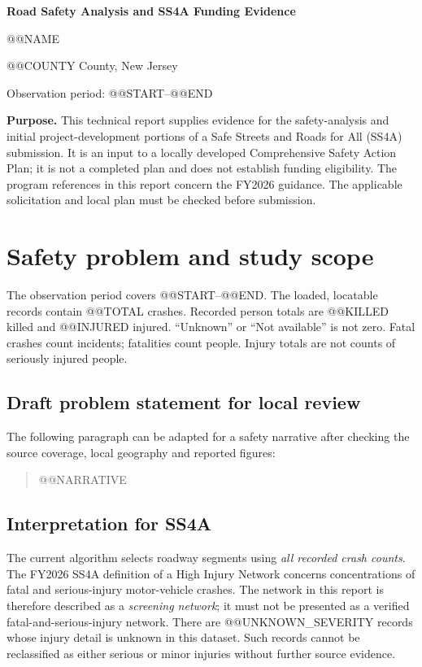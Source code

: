 \documentclass[10pt,letterpaper]{article}
\begin{document}
\begin{center}
{\Large\bfseries Road Safety Analysis and SS4A Funding Evidence}\par
\vspace{4pt}
{\large @@NAME}\par
@@COUNTY County, New Jersey\par
Observation period: @@START--@@END
\end{center}
\vspace{4pt}
\textbf{Purpose.} This technical report supplies evidence for the safety-analysis
and initial project-development portions of a Safe Streets and Roads for All
(SS4A) submission. It is an input to a locally developed Comprehensive Safety
Action Plan; it is not a completed plan and does not establish funding eligibility.
The program references in this report concern the FY2026 guidance. The applicable
solicitation and local plan must be checked before submission.\cite{nofo,actionplan}

\section{Safety problem and study scope}
The observation period covers @@START--@@END. The loaded, locatable records contain
@@TOTAL crashes. Recorded person totals are @@KILLED killed and @@INJURED injured.
``Unknown'' or ``Not available'' is not zero. Fatal crashes count incidents;
fatalities count people. Injury totals are not counts of seriously injured people.

\subsection{Draft problem statement for local review}
The following paragraph can be adapted for a safety narrative after checking the
source coverage, local geography and reported figures:
\begin{quote}
@@NARRATIVE
\end{quote}

\subsection{Interpretation for SS4A}
The current algorithm selects roadway segments using \emph{all recorded crash
counts}. The FY2026 SS4A definition of a High Injury Network concerns concentrations
of fatal and serious-injury motor-vehicle crashes.\cite{nofo} The network in this
report is therefore described as a \emph{screening network}; it must not be presented
as a verified fatal-and-serious-injury network. There are @@UNKNOWN_SEVERITY records
whose injury detail is unknown in this dataset. Such records cannot be reclassified
as either serious or minor injuries without further source evidence.
\end{document}
